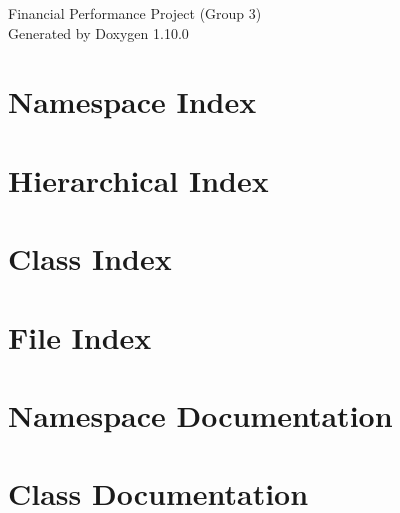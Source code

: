 \documentclass[twoside]{book}
\newcommand{\+}{\discretionary{\mbox{\scriptsize$\hookleftarrow$}}{}{}}
\newcommand{\clearemptydoublepage}{%
    \newpage{\pagestyle{empty}\cleardoublepage}%
  }
\begin{document}
  \raggedbottom
    \hypersetup{pageanchor=false,
                bookmarksnumbered=true,
                pdfencoding=unicode
               }
  \begin{titlepage}
  \vspace*{7cm}
  \begin{center}%
  {\Large Financial Performance Project (\+Group 3)}\\
  \vspace*{1cm}
  {\large Generated by Doxygen 1.10.0}\\
  \end{center}
  \end{titlepage}
  \clearemptydoublepage
  \tableofcontents
  \clearemptydoublepage
  \hypersetup{pageanchor=true}
\chapter{Namespace Index}

\chapter{Hierarchical Index}

\chapter{Class Index}

\chapter{File Index}

\chapter{Namespace Documentation}



















\chapter{Class Documentation}








\end{document}
